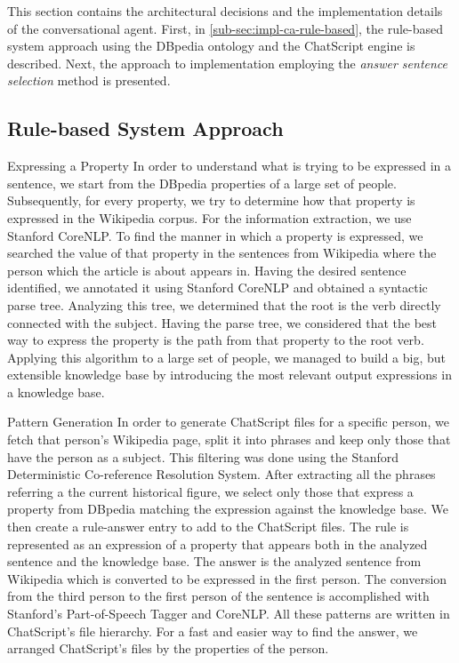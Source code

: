 This section contains the architectural decisions and the implementation details of the conversational agent. First, in \autoref{sub-sec:impl-ca-rule-based}, the  rule-based system approach using the DBpedia ontology and the ChatScript engine is described. Next, the approach to implementation employing the {\em answer sentence selection} method is presented.

\subsection{Rule-based System Approach}
\label{sub-sec:impl-ca-rule-based}

Expressing a Property
In order to understand what is trying to be expressed in a
sentence, we start from the DBpedia properties of a large
set of people. Subsequently, for every property, we try to
determine how that property is expressed in the Wikipedia
corpus. For the information extraction, we use Stanford
CoreNLP.
To find the manner in which a property is expressed, we
searched the value of that property in the sentences from
Wikipedia where the person which the article is about
appears in. Having the desired sentence identified, we
annotated it using Stanford CoreNLP and obtained a
syntactic parse tree. Analyzing this tree, we determined that
the root is the verb directly connected with the subject.
Having the parse tree, we considered that the best way to
express the property is the path from that property to the
root verb.
Applying this algorithm to a large set of people, we
managed to build a big, but extensible knowledge base by
introducing the most relevant output expressions in a
knowledge base.

Pattern Generation
In order to generate ChatScript files for a specific person, we fetch that person's Wikipedia page, split it into phrases and keep only those that have the person as a subject. This filtering was done using the Stanford Deterministic Co-reference Resolution System. After extracting all the phrases referring a the current historical figure, we select only those that express a property from DBpedia matching the expression against the knowledge base. We then create a rule-answer entry to add to the ChatScript files. The rule is represented as an expression of a property that appears both in the analyzed sentence and the knowledge base. The answer is the analyzed sentence from Wikipedia which is converted to be expressed in the first person. The conversion from the third person to the first person of the sentence is accomplished with Stanford's Part-of-Speech Tagger and CoreNLP. All these patterns are written in ChatScript's file hierarchy. For a fast and easier way to find the answer, we arranged ChatScript's files by the properties of the person.


